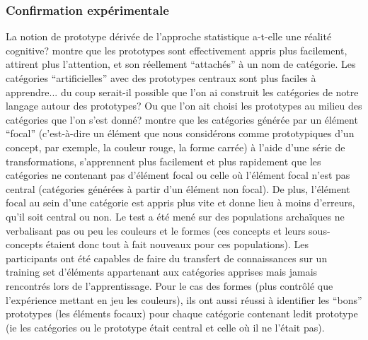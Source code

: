 \documentclass[french]{article}
\begin{document}
				\subsubsection{Confirmation expérimentale}
					La notion de prototype dérivée de l'approche statistique a-t-elle une réalité cognitive? \cite{rosch1973} montre que les prototypes sont effectivement appris plus facilement, attirent plus l'attention, et son réellement ``attachés'' à un nom de catégorie.
					Les catégories ``artificielles'' avec des prototypes centraux sont plus faciles à apprendre... du coup serait-il possible que l'on ai construit les catégories de notre langage autour des prototypes? Ou que l'on ait choisi les prototypes au milieu des catégories que l'on s'est donné?
					\cite{rosch1973} montre que les catégories générée par un élément ``focal'' (c'est-à-dire un élément que nous considérons comme prototypiques d'un concept, par exemple, la couleur rouge, la forme carrée) à l'aide d'une série de transformations, s'apprennent plus facilement et plus rapidement que les catégories ne contenant pas d'élément focal ou celle où l'élément focal n'est pas central (catégories générées à partir d'un élément non focal). De plus, l'élément focal au sein d'une catégorie est appris plus vite et donne lieu à moins d'erreurs, qu'il soit central ou non. Le test a été mené sur des populations archaïques ne verbalisant pas ou peu les couleurs et le formes (ces concepts et leurs sous-concepts étaient donc tout à fait nouveaux pour ces populations). Les participants ont été capables de faire du transfert de connaissances sur un training set d'éléments appartenant aux catégories apprises mais jamais rencontrés lors de l'apprentissage. Pour le cas des formes (plus contrôlé que l'expérience mettant en jeu les couleurs), ils ont aussi réussi à identifier les ``bons'' prototypes (les éléments focaux) pour chaque catégorie contenant ledit prototype (ie les catégories ou le prototype était central et celle où il ne l'était pas).\\
\end{document}
